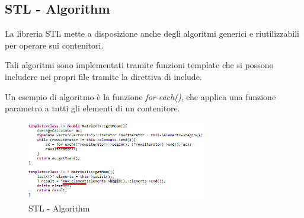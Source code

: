 \subsection{STL - Algorithm}
La libreria STL mette a disposizione anche degli algoritmi generici e riutilizzabili per operare sui contenitori.

Tali algoritmi sono implementati tramite funzioni template che si possono includere nei propri file tramite la direttiva di include.

Un esempio di algoritmo è la funzione \textit{for-each()}, che applica una funzione parametro a tutti gli
elementi di un contenitore.

\begin{figure}[h]
	\centering
	\includegraphics[width=0.7\textwidth]{Immagini/Stl_Algorithm.png}
	\caption{STL - Algorithm}
	\label{fig:Algoritm}
\end{figure}